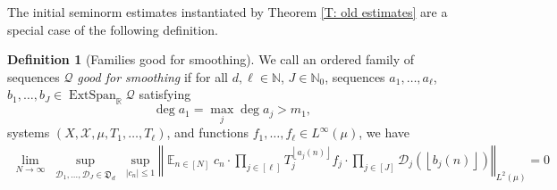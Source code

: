 \documentclass[11pt]{amsart}
\theoremstyle{definition}
\newtheorem{definition}[lemma]{Definition}
\DeclareMathOperator*{\E}{\mathbb{E}}
\newcommand{\N}{{\mathbb N}}
\newcommand{\R}{{\mathbb R}}
\newcommand{\CD}{{\mathcal D}}
\newcommand{\CQ}{{\mathcal Q}}
\newcommand{\CX}{{\mathcal X}}
\newcommand{\FD}{{\mathfrak D}}
\newcommand{\be}{{\mathbf{e}}}
\newcommand{\norm}[1]{\left\Vert #1\right\Vert}
\newcommand{\nnorm}[1]{\lvert\!|\!| #1|\!|\!\rvert}
\newcommand{\1}{{\mathbf{1}}}
\DeclareMathOperator{\extspan}{ExtSpan}
\newcommand{\floor}[1]{{\left \lfloor #1 \right \rfloor}}
\begin{document}
The initial seminorm estimates instantiated by Theorem \ref{T: old estimates} are a special case of the following definition. 
\begin{definition}[Families good for smoothing]
    We call an ordered family of sequences $\CQ$ \textit{good for smoothing} if for all $d,\ell\in\N$, $J\in\N_0$, sequences $a_1, \ldots, a_\ell$, $b_1, \ldots, b_J\in \extspan_\R\CQ$  
     satisfying $$\deg a_1 = \max_j\deg a_j > m_1,$$
    systems $(X, \CX, \mu, T_1, \ldots, T_\ell)$, %
    and functions $f_1, \ldots, f_\ell\in L^\infty(\mu)$, we have 
     \begin{align}\label{E: gen box bound}
         \lim_{N\to\infty}\sup_{\substack{\CD_1, \ldots, \CD_J \in \FD_d}} \sup_{|c_n|\leq 1}\norm{\E_{n\in [N]} c_{n}\cdot \prod_{j\in[\ell]}  T_{j}^{\floor{a_j(n)}} f_j \cdot \prod_{j\in[J]}\CD_j(\floor{b_j(n)})}_{L^2(\mu)} = 0

\end{align}
\end{definition}
\end{document}
